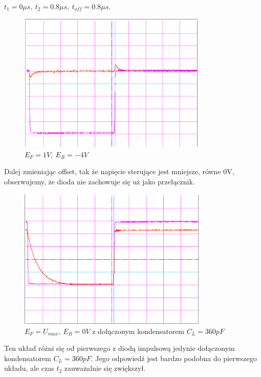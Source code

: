 \documentclass[a4paper,11pt]{article}
\begin{document}
 \(t_1 = 0 \mu s,\ t_2 = 0.8 \mu s,\ t_{off} = 0.8 \mu s \).

\begin{figure} [H]
  \begin{center}
    \includegraphics[width = 9cm]{../Obrazki_i_tekst/obrobione/31dsciety.png}
    \caption{\( E_F = 1V, \ E_R = -4 V\)}
  \end{center}
\end{figure}

Dalej zmieniając offset, tak że napięcie sterujące jest mniejsze, równe 0V, obserwujemy, że dioda nie zachowuje się uż jako przełącznik.

\begin{figure} [H]
  \begin{center}
    \includegraphics[width = 9cm]{../Obrazki_i_tekst/obrobione/31esciety.png}
    \caption{\( E_F = U_{max}, \ E_R = 0V \) z dołączonym kondensatorem \(C_L = 360 pF\)}
  \end{center}
\end{figure}

Ten układ różni się od pierwszego z diodą impulsową jedynie dołączonym kondensatorem \(C_L = 360 pF\). Jego odpowiedź jest bardzo podobna do pierwszego układu, ale czas \( t_2 \) zauważalnie się zwiększył.
\end{document}

